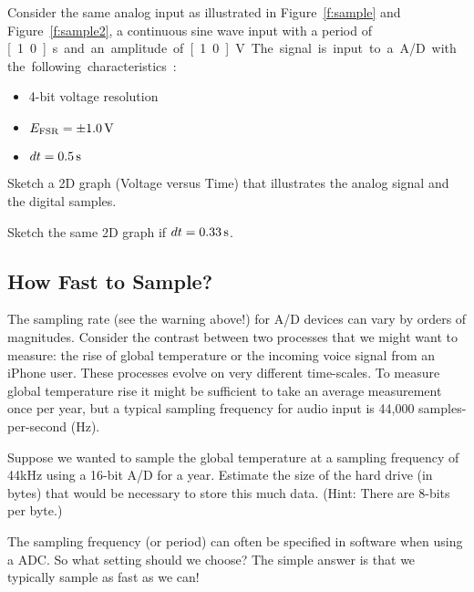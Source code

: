 \begin{ex}
Consider the same analog input as illustrated in Figure~\ref{f:sample} and Figure~\ref{f:sample2}, a continuous sine wave input with a period of \unit[1.0]{s} and an amplitude of \unit[1.0]{V}.  The signal is input to a A/D with the following characteristics:
\begin{itemize} 
\item 4-bit voltage resolution
\item $E_{\mathrm{FSR}}= \pm \unit[1.0]{V}$
\item $dt = \unit[0.5]{s}$
\end{itemize}
Sketch a 2D graph (Voltage versus Time) that illustrates the analog signal and the digital samples.

\vspace{1ex}

Sketch the same 2D graph if $dt=\unit[0.33]{s}$.
\end{ex}

\subsection{How Fast to Sample?}
The sampling rate (see the warning above!) for A/D devices can vary by orders of magnitudes. Consider the contrast between two processes that we might want to measure: the rise of global temperature or the incoming voice signal from an iPhone user.  These processes evolve on very different time-scales.  To measure global temperature rise it might be sufficient to take an average measurement once per year, but a typical sampling frequency for audio input is 44,000 samples-per-second (Hz).  

\begin{ex}
Suppose we wanted to sample the global temperature at a sampling frequency of \unit{44}{kHz} using a 16-bit A/D for a year.  Estimate the size of the hard drive (in bytes) that would be necessary to store this much data.  (Hint: There are 8-bits per byte.)
\end{ex}

The sampling frequency (or period) can often be specified in software when using a ADC.  So what setting should we choose?  The simple answer is that we typically sample as fast as we can!

